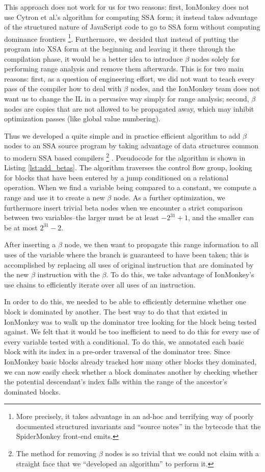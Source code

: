 \documentclass{article}
\begin{document}
This approach does not work for us for two reasons: first, IonMonkey
does not use Cytron et al.'s algorithm for computing SSA form; it
instead takes advantage of the structured nature of JavaScript code to
go to SSA form without computing dominance frontiers \footnote{More
  precisely, it takes advantage in an ad-hoc and terrifying way of
  poorly documented structured invariants and ``source notes'' in the
  bytecode that the SpiderMonkey front-end emits.}.  Furthermore, we
decided that instead of putting the program into XSA form at the
beginning and leaving it there through the compilation phase, it would
be a better idea to introduce $\beta$ nodes solely for performing
range analysis and remove them afterwards. This is for two main
reasons: first, as a question of engineering effort, we did not want
to teach every pass of the compiler how to deal with $\beta$ nodes,
and the IonMonkey team does not want us to change the IL in a pervasive
way simply for range analysis; second, $\beta$ nodes are copies that
are not allowed to be propagated away, which may inhibit optimization
passes (like global value numbering).

Thus we developed a quite simple and in practice efficient algorithm to
add $\beta$ nodes to an SSA source program by taking
advantage of data structures common to modern SSA based compilers
\footnote{The method for removing $\beta$ nodes is so trivial that we
  could not claim with a straight face that we ``developed an
  algorithm'' to perform it.} .  Pseudocode for the algorithm is shown
in Listing \ref{lst:add_betas}. The algorithm traverses the control
flow group, looking for blocks that have been entered by a jump
conditioned on a relational operation. When we find a variable being
compared to a constant, we compute a range and use it to create a new
$\beta$ node. As a further optimization, we furthermore insert trivial beta
nodes when we encounter a
strict comparison between two variables--the larger must be at least
$-2^{31}+1$, and the smaller can be at most $2^{31}-2$.

After inserting a $\beta$ node, we then want to propagate this range information to all uses
of the variable where the branch is guaranteed to have been taken;
this is accomplished by replacing all uses of original instruction
that are dominated by the new $\beta$ instruction with the $\beta$. To
do this, we take advantage of IonMonkey's use chains to efficiently
iterate over all uses of an instruction.

In order to do this, we needed to be able to efficiently determine
whether one block is dominated by another. The best way to do that
that existed in IonMonkey was to walk up the dominator tree looking
for the block being tested against. We felt that it would be too
inefficient to need to do this for every use of every variable tested
with a conditional. To do this, we annotated each basic block with its
index in a pre-order traversal of the dominator tree. Since IonMonkey
basic blocks already tracked how many other blocks they dominated, we
can now easily check whether a block dominates another by checking
whether the potential descendant's index falls within the range of the
ancestor's dominated blocks.
\end{document}
